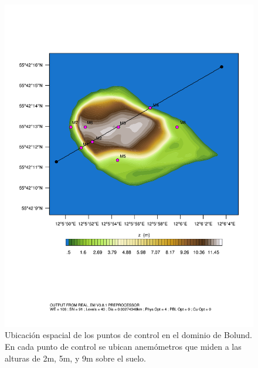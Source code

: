 \newpage
\vspace*{\fill}
\begin{figure}[H]
	\centering
	\includegraphics[width=0.9\linewidth,page=1,trim={0cm 6cm -1cm 4cm},clip]{Imagenes/05/bol_control_point.pdf}%
	\caption{Ubicación espacial de los puntos de control en el dominio de Bolund. En cada punto de control se ubican anemómetros que miden a las alturas de 2m, 5m, y 9m sobre el suelo.}
	\label{fig:05_d08_bol}
\end{figure}

